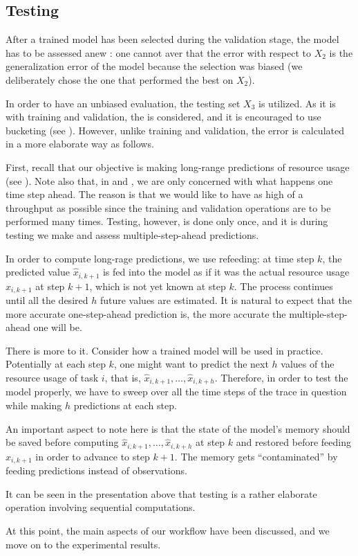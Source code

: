 \subsection{Testing} 
After a trained model has been selected during the validation stage, the model
has to be assessed anew \cite{hastie2009}: one cannot aver that the error with
respect to $X_2$ is the generalization error of the model because the selection
was biased (we deliberately chose the one that performed the best on $X_2$).

In order to have an unbiased evaluation, the testing set $X_3$ is utilized. As
it is with training and validation, the  is considered, and it is
encouraged to use bucketing (see ). However, unlike training and
validation, the error is calculated in a more elaborate way as follows.

First, recall that our objective is making long-range predictions of resource
usage (see ). Note also that, in  and
, we are only concerned with what happens one time step ahead.
The reason is that we would like to have as high of a throughput as possible
since the training and validation operations are to be performed many times.
Testing, however, is done only once, and it is during testing we make and assess
multiple-step-ahead predictions.

In order to compute long-rage predictions, we use refeeding: at time step $k$,
the predicted value $\hat{x}_{i,k + 1}$ is fed into the model as if it was the
actual resource usage $x_{i,k + 1}$ at step $k + 1$, which is not yet known at
step $k$. The process continues until all the desired $h$ future values are
estimated. It is natural to expect that the more accurate one-step-ahead
prediction is, the more accurate the multiple-step-ahead one will be.

There is more to it. Consider how a trained model will be used in practice.
Potentially at each step $k$, one might want to predict the next $h$ values of
the resource usage of task $i$, that is, $\hat{x}_{i,k + 1}, \dots, \hat{x}_{i,k
+ h}$. Therefore, in order to test the model properly, we have to sweep over all
the time steps of the trace in question while making $h$ predictions at each
step.

An important aspect to note here is that the state of the model's memory should
be saved before computing $\hat{x}_{i,k + 1}, \dots, \hat{x}_{i,k + h}$ at step
$k$ and restored before feeding $x_{i,k + 1}$ in order to advance to step $k +
1$. The memory gets ``contaminated'' by feeding predictions instead of
observations.

It can be seen in the presentation above that testing is a rather elaborate
operation involving sequential computations.

At this point, the main aspects of our workflow have been discussed, and we move
on to the experimental results.
